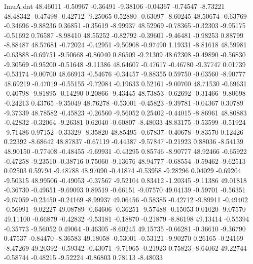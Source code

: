\begin{filecontents}{ImuA.dat}
  48.46011   -0.50967   -0.36491   -9.38106   -0.04367   -0.74547   -8.73221
  48.48342   -0.47498   -0.42712   -9.25065    0.52880   -0.63097   -8.60245
  48.50674   -0.63769   -0.34696   -9.88236    0.36851   -0.35619   -8.99937
  48.52969   -0.78365   -0.32303   -9.95175   -0.51692    0.76587   -8.98410
  48.55252   -0.82792   -0.39601   -9.46481   -0.98253    0.88799   -8.88487
  48.57681   -0.72024   -0.42951   -9.50908   -0.97490    1.19331   -8.81618
  48.59981   -0.63888   -0.69751   -9.50668   -0.86040    0.86509   -9.21309
  48.62308   -0.49890   -0.56830   -9.30569   -0.95200   -0.51648   -9.11386
  48.64607   -0.47617   -0.46780   -9.37747    0.01739   -0.53174   -9.00700
  48.66913   -0.54676   -0.34457   -9.88355    0.59750   -0.03560   -8.90777
  48.69219   -0.47019   -0.55155   -9.72084   -0.19633    0.52161   -9.00700
  48.71530   -0.69631   -0.40798   -9.81895   -0.14290    0.20866   -9.43445
  48.73853   -0.62692   -0.31466   -9.80698   -0.24213    0.43765   -9.35049
  48.76278   -0.53001   -0.45823   -9.39781   -0.04367    0.30789   -9.37339
  48.78582   -0.45823   -0.26560   -9.56052    0.25402   -0.44015   -8.86961
  48.80883   -0.42832   -0.32064   -9.26381    0.62040   -0.60807   -8.48033
  48.83175   -0.53599   -0.51924   -9.71486    0.97152   -0.33329   -8.35820
  48.85495   -0.67837   -0.40678   -9.83570    0.12426    0.22392   -8.68642
  48.87837   -0.67119   -0.44387   -9.57847   -0.21923    0.88036   -8.54139
  48.90150   -0.77408   -0.48455   -9.69931   -0.43295    0.85746   -8.90777
  48.92466   -0.65922   -0.47258   -9.23510   -0.38716    0.75060   -9.13676
  48.94777   -0.68554   -0.59462   -9.62513    0.02503    0.59794   -9.48788
  48.97090   -0.41874   -0.53958   -9.28296    0.04029   -0.69204   -9.50315
  48.99506   -0.49053   -0.37567   -9.52104    0.83412   -1.20345   -9.11386
  49.01818   -0.36730   -0.49651   -9.69093    0.89519   -0.66151   -9.07570
  49.04139   -0.59701   -0.56351   -9.67059   -0.23450   -0.24169   -8.99937
  49.06456   -0.58385   -0.42712   -9.89911   -0.49402   -0.56991   -9.02227
  49.08789   -0.64606   -0.36251   -9.57488   -0.15053    0.01020   -9.07570
  49.11100   -0.66879   -0.42832   -9.53181   -0.18870   -0.21879   -8.86198
  49.13414   -0.55394   -0.35773   -9.56052    0.49064   -0.46305   -8.60245
  49.15735   -0.66281   -0.36610   -9.36790    0.47537   -0.84470   -8.36583
  49.18058   -0.53001   -0.53121   -9.90270    0.26165   -0.24169   -8.47269
  49.20392   -0.59342   -0.43071   -9.71965   -0.21923    0.75823   -8.64062
  49.22744   -0.58744   -0.48215   -9.52224   -0.86803    0.78113   -8.48033

\end{filecontents}
